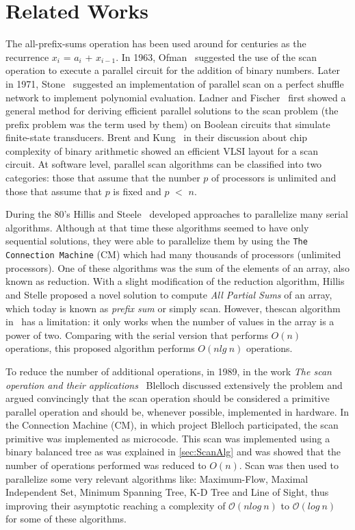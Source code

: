 \documentclass[Ingles]{ic-tese-v1}
\newcommand{\ttt}[1]{{\texttt{#1}}}
\newcommand{\tit}[1]{{\textit{#1}}}
\begin{document}
\chapter{Related Works}
\label{cap:RelatedWorks}

The all-prefix-sums operation has been used around for centuries as the recurrence
$x_{i}$ = $a_{i}$ + $x_{i−1}$. In 1963, Ofman~\cite{Ofman:1962} suggested the use of the scan operation to execute a parallel circuit for the addition of binary numbers. Later in 1971, Stone~\cite{Stone:1971} suggested an implementation of parallel scan  on a perfect shuffle network to implement polynomial evaluation. Ladner and Fischer~\cite{Ladner:1980} first showed a general method for deriving efficient parallel solutions to the scan problem (the prefix problem was the term used by them) on Boolean circuits that simulate finite-state transducers. Brent and Kung~\cite{Brent:1981} in their discussion about chip complexity of binary arithmetic showed an efficient VLSI layout for a scan circuit.
At software level, parallel scan algorithms can be classified into two categories: those that assume that the number $p$ of processors is unlimited and those that assume that $p$ is fixed and $p$ $<$ $n$.

During  the 80's  Hillis and  Steele~\cite{dataparallel} developed
approaches to parallelize many serial algorithms. Although at that time
these algorithms  seemed to have only  sequential solutions, they were able to parallelize them by  using the
\ttt{The  Connection Machine}  (CM) \cite{themachine} which had many thousands of processors (unlimited processors). One of these algorithms was the sum of the elements of an  array, also known as  reduction.  With a slight modification of the reduction algorithm, Hillis and Stelle proposed a novel solution to compute \textit{All Partial Sums} of an array, which today  is known  as \tit{prefix sum} or simply scan. However, thescan algorithm in~\cite{dataparallel} has a limitation: it only works when the number of values in the array is a power of two. Comparing with the serial version that performs $O(n)$ operations, this proposed algorithm performs $O(n lg\ n)$ operations.

To reduce the number of additional operations, in 1989, in the work \textit{The scan operation and their applications}~\cite{ScanAsPrimitive} Blelloch discussed extensively the problem and argued convincingly that the scan operation should be considered a primitive parallel operation and should be, whenever 	possible, implemented in hardware. In the Connection Machine (CM), in which project  Blelloch participated, the scan primitive was implemented as microcode. This scan was  implemented using a binary balanced tree as was explained in  \ref{sec:ScanAlg} and was showed that the number of operations performed was reduced to $O(n)$.  Scan was  then used  to parallelize   some  very  relevant   algorithms  like: Maximum-Flow, Maximal Independent Set, Minimum Spanning Tree, K-D Tree and Line  of Sight, thus improving their asymptotic reaching a complexity of $\mathcal{O}(n log\ n)$ to $\mathcal{O}(log\ n)$ for some of these algorithms.
\end{document}
